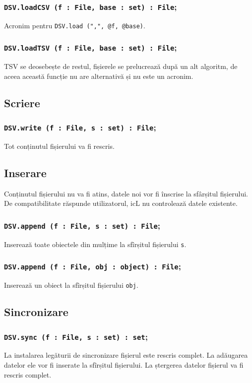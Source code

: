 \subsubsection{\texttt{DSV.loadCSV (f : File, base : set) : File};}

Acronim pentru \texttt{DSV.load (",", @f, @base)}.

\subsubsection{\texttt{DSV.loadTSV (f : File, base : set) : File};}

TSV se deosebește de restul, fișierele se prelucrează după un alt algoritm, de aceea această funcție nu are alternativă și nu este un acronim.

\subsection{Scriere}

\subsubsection{\texttt{DSV.write (f : File, s : set) : File};}

Tot conținutul fișierului va fi rescris.

\subsection{Inserare}

Conținutul fișierului nu va fi atins, datele noi vor fi înscrise la sfârșitul fișierului. De compatibilitate răspunde utilizatorul, icL nu controlează datele existente.

\subsubsection{\texttt{DSV.append (f : File, s : set) : File};}

Inserează toate obiectele din mulțime la sfîrșitul fișierului \texttt{s}.

\subsubsection{\texttt{DSV.append (f : File, obj : object) : File};}

Inserează un obiect la sfîrșitul fișierului \texttt{obj}.

\subsection{Sincronizare}

\subsubsection{\texttt{DSV.sync (f : File, s : set) : set};}

La instalarea legăturii de sincronizare fișierul este rescris complet. La adăugarea datelor ele vor fi inserate la sfîrșitul fișierului. La ștergerea datelor fișierul va fi rescris complet.

